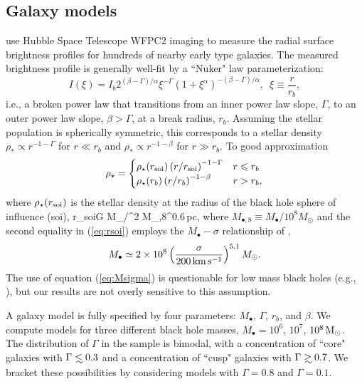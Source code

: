 \documentclass[usenatbib,fleqn]{mn2e}
\newcommand\lsim{\mathrel{\rlap{\lower4pt\hbox{\hskip1pt$\sim$}}
    \raise1pt\hbox{$<$}}}
\newcommand\gsim{\mathrel{\rlap{\lower4pt\hbox{\hskip1pt$\sim$}}
    \raise1pt\hbox{$>$}}}
\newcommand{\rb}{r_b}
\newcommand{\rhostar}{\rho_*}
\newcommand{\Mbh}[1][]{M_{\bullet#1}}
\newcommand{\soi}{\rm soi}
\newcommand{\rsoi}{r_{\soi}}
\begin{document}
\subsection{Galaxy models}
\label{sec:gal_model}
\citet{LauerFaber+:2007a} use Hubble Space Telescope WFPC2 imaging to measure the radial surface brightness profiles for hundreds of nearby early type galaxies. The measured brightness profile is generally well-fit by a ``Nuker" law parameterization:
\begin{equation}
  I(\xi)=I_b 2^{(\beta-\Gamma)/\alpha} \xi^{-\Gamma} (1+\xi^\alpha)^{-(\beta-\Gamma)/\alpha}, \,\,\,\xi\equiv\frac{r}{r_b},
\end{equation}
i.e., a broken power law that transitions from an inner power law slope, $\Gamma$, to an outer power law slope, $\beta > \Gamma$, at a break radius, $\rb$.  Assuming the stellar population is spherically symmetric, this corresponds to a stellar density $\rhostar \propto r^{-1-\Gamma}$ for $r \ll \rb$ and $\rhostar\propto r^{-1-\beta}$ for $r \gg \rb$.  To good approximation
\begin{align}
\rho_\star = 
\begin{cases}
\rho_\star(\rsoi) \left(r/\rsoi\right)^{-1-\Gamma} & r \leq r_b\\
\rho_\star(r_b) \left(r/r_b\right)^{-1-\beta} & r > r_b,
\label{eq:rhostar}
\end{cases}
\end{align}
where $\rho_\star(\rsoi)$ is the stellar density at the radius of the black hole sphere of influence (soi), 
\be
\rsoi \simeq G \Mbh/\sigma^2  M_{\bullet,8}^{0.6}\,{\rm pc},
\label{eq:rsoi}
\ee
where $M_{\bullet,8} \equiv M_{\bullet}/10^{8}M_{\odot}$ and the second equality in (\ref{eq:rsoi}) employs the $\Mbh-\sigma$ relationship of \citet{Gultekin+09},
 \begin{align}
M_{\bullet} \simeq 2\times 10^{8}\left(\frac{\sigma}{200\,{\rm
      km\,s^{-1}}}\right)^{5.1}M_{\odot}.
\label{eq:Msigma}
\end{align}
The use of equation (\ref{eq:Msigma}) is questionable for low mass black holes (e.g., \citealt{Greene&Ho07}), but our results are not overly sensitive to this assumption.  

A galaxy model is fully specified by four parameters: $\Mbh$,
$\Gamma$, $r_b$, and $\beta$.  We compute models for three different
black hole masses, $\Mbh = 10^6$, $10^7$, $10^8 \,{\rm M_\odot}$.  The
distribution of $\Gamma$ in the \citet{LauerFaber+:2007a} sample is
bimodal, with a concentration of ``core" galaxies with $\Gamma \lsim
0.3$ and a concentration of ``cusp" galaxies with $\Gamma \gsim 0.7$.
We bracket these possibilities by considering models with $\Gamma=0.8$
and $\Gamma=0.1$.  
\end{document}
